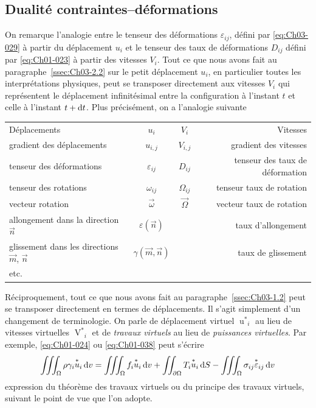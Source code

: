 \subsection{Dualité contraintes--déformations} \label{ssec:Ch03-2.3}
On remarque l'analogie entre le tenseur des déformations $\varepsilon_{ij}$, défini par \eqref{eq:Ch03-029} à partir du déplacement $u_i$ et le tenseur des taux de déformations $D_{ij}$ défini par \eqref{eq:Ch01-023} à partir des vitesses $V_i$.
Tout ce que nous avons fait au paragraphe~\ref{ssec:Ch03-2.2} sur le petit déplacement $u_i$, en particulier toutes les interprétations physiques, peut se transposer directement aux vitesses $V_i$ qui représentent le déplacement infinitésimal entre la configuration à l'instant $t$ et celle à l'instant $t+\mathop{\mathrm{{}d}}\mathopen{} t$.
Plus précisément, on a l'analogie suivante
\begin{center}
    \begin{tabular}[c]{lccr}
        Déplacements & $u_i$ & $V_i$ & Vitesses \\
        gradient des déplacements & $u_{i,j}$ & $V_{i,j}$ & gradient des vitesses \\
        tenseur des déformations & $\varepsilon_{ij}$ & $D_{ij}$ & tenseur des taux de déformation \\
        tenseur des rotations & $\omega_{ij}$ & $\Omega_{ij}$ & tenseur taux de rotation \\
        vecteur rotation & $\vec{\omega}$ & $\vec{\Omega}$ & vecteur taux de rotation \\
        allongement dans la direction $\vec{n}$ & $\varepsilon (\vec{n})$ & & taux d'allongement \\
        glissement dans les directions $\vec{m}$, $\vec{n}$ & $\gamma (\vec{m},\vec{n})$ & & taux de glissement \\
        etc.
    \end{tabular}
\end{center}

Réciproquement, tout ce que nous avons fait au paragraphe~\ref{ssec:Ch03-1.2} peut se transposer directement en termes de déplacements.
Il s'agit simplement d'un changement de terminologie.
On parle de déplacement virtuel ${\mathop{u}^{*}}_i$ au lieu de vitesses virtuelles ${\mathop{V}^{*}}_i$ et de \emph{travaux virtuels} au lieu de \emph{puissances virtuelles}.
Par exemple, \eqref{eq:Ch01-024} ou \eqref{eq:Ch01-038} peut s'écrire
\begin{equation}
    \iiint_{\Omega} \rho \gamma_i {\mathop{u}^*}_i \mathop{\mathrm{{}d}}\mathopen{} v = \iiint_{\Omega} f_i {\mathop{u}^*}_i \mathop{\mathrm{{}d}}\mathopen{} v + \iint_{\partial \Omega} T_i {\mathop{u}^*}_i \mathop{\mathrm{{}d}}\mathopen{} S - \iiint_{\Omega} \sigma_{ij} {\mathop{\varepsilon}^*}_{ij} \mathop{\mathrm{{}d}}\mathopen{} v
    \label{eq:Ch03-046}
\end{equation}
expression du théorème des travaux virtuels ou du principe des travaux virtuels, suivant le point de vue que l'on adopte.

